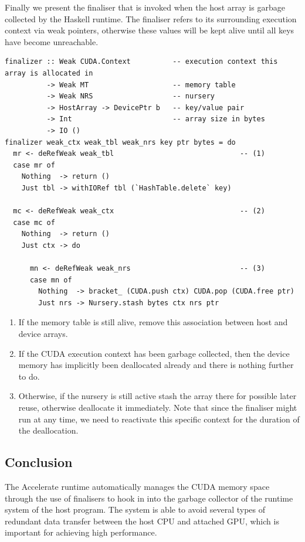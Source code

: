 Finally we present the finaliser that is invoked when the host array is garbage
collected by the Haskell runtime. The finaliser refers to its surrounding
execution context via weak pointers, otherwise these values will be kept alive
until all keys have become unreachable.
%
\begin{lstlisting}[style=haskell]
finalizer :: Weak CUDA.Context          -- execution context this array is allocated in
          -> Weak MT                    -- memory table
          -> Weak NRS                   -- nursery
          -> HostArray -> DevicePtr b   -- key/value pair
          -> Int                        -- array size in bytes
          -> IO ()
finalizer weak_ctx weak_tbl weak_nrs key ptr bytes = do
  mr <- deRefWeak weak_tbl                              -- (1)
  case mr of
    Nothing  -> return ()
    Just tbl -> withIORef tbl (`HashTable.delete` key)

  mc <- deRefWeak weak_ctx                              -- (2)
  case mc of
    Nothing  -> return ()
    Just ctx -> do

      mn <- deRefWeak weak_nrs                          -- (3)
      case mn of
        Nothing  -> bracket_ (CUDA.push ctx) CUDA.pop (CUDA.free ptr)
        Just nrs -> Nursery.stash bytes ctx nrs ptr
\end{lstlisting}
%
\begin{enumerate}
\item If the memory table is still alive, remove this association between host
    and device arrays.

\item If the CUDA execution context has been garbage collected, then the device
    memory has implicitly been deallocated already and there is nothing further
    to do.

\item Otherwise, if the nursery is still active stash the array there for
    possible later reuse, otherwise deallocate it immediately. Note that since
    the finaliser might run at any time, we need to reactivate this specific
    context for the duration of the deallocation.
\end{enumerate}


\subsection{Conclusion}

The Accelerate runtime automatically manages the CUDA memory space through the
use of finalisers to hook in into the garbage collector of the runtime system of
the host program. The system is able to avoid several types of redundant data
transfer between the host CPU and attached GPU, which is important for achieving
high performance.

